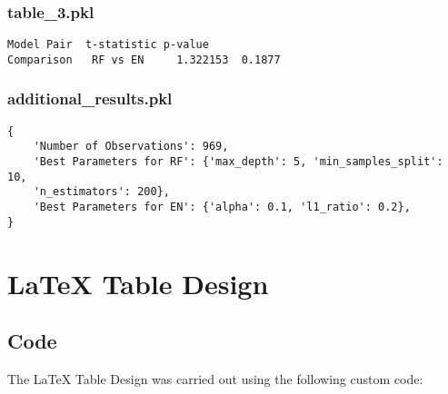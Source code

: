 \documentclass[11pt]{article}
\begin{document}
\subsubsection*{table\_3.pkl}

\begin{Verbatim}[tabsize=4]
           Model Pair  t-statistic p-value
Comparison   RF vs EN     1.322153  0.1877
\end{Verbatim}

\subsubsection*{additional\_results.pkl}

\begin{Verbatim}[tabsize=4]
{
    'Number of Observations': 969,
    'Best Parameters for RF': {'max_depth': 5, 'min_samples_split': 10,
	'n_estimators': 200},
    'Best Parameters for EN': {'alpha': 0.1, 'l1_ratio': 0.2},
}
\end{Verbatim}

\section{LaTeX Table Design}
\subsection{{Code}}
The LaTeX Table Design was carried out using the following custom code:
\end{document}
